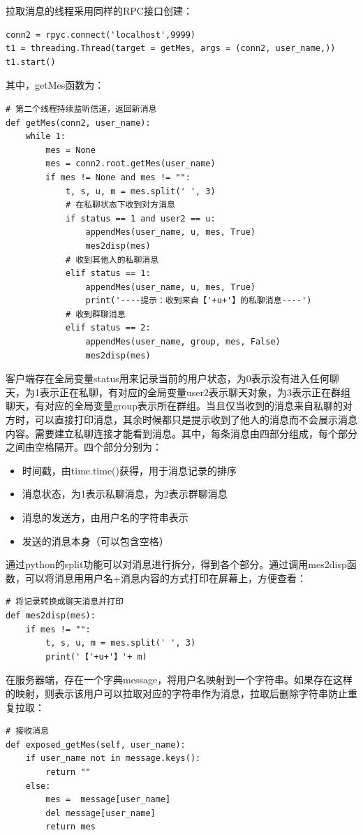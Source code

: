 \documentclass{report}
\begin{document}
拉取消息的线程采用同样的RPC接口创建：
\begin{lstlisting}
conn2 = rpyc.connect('localhost',9999)
t1 = threading.Thread(target = getMes, args = (conn2, user_name,))
t1.start()
\end{lstlisting}
其中，getMes函数为：
\begin{lstlisting}
# 第二个线程持续监听信道，返回新消息
def getMes(conn2, user_name):
    while 1:
        mes = None
        mes = conn2.root.getMes(user_name)
        if mes != None and mes != "":
            t, s, u, m = mes.split(' ', 3)
            # 在私聊状态下收到对方消息
            if status == 1 and user2 == u:
                appendMes(user_name, u, mes, True)
                mes2disp(mes)
            # 收到其他人的私聊消息
            elif status == 1:
                appendMes(user_name, u, mes, True)
                print('----提示：收到来自【'+u+'】的私聊消息----')
            # 收到群聊消息
            elif status == 2:
                appendMes(user_name, group, mes, False)
                mes2disp(mes)
\end{lstlisting}
客户端存在全局变量status用来记录当前的用户状态，为0表示没有进入任何聊天，为1表示正在私聊，有对应的全局变量user2表示聊天对象，为3表示正在群组聊天，有对应的全局变量group表示所在群组。当且仅当收到的消息来自私聊的对方时，可以直接打印消息，其余时候都只是提示收到了他人的消息而不会展示消息内容。需要建立私聊连接才能看到消息。其中，每条消息由四部分组成，每个部分之间由空格隔开。四个部分分别为：
\begin{itemize}
\item 时间戳，由time.time()获得，用于消息记录的排序
\item 消息状态，为1表示私聊消息，为2表示群聊消息
\item 消息的发送方，由用户名的字符串表示
\item 发送的消息本身（可以包含空格）
\end{itemize}
通过python的split功能可以对消息进行拆分，得到各个部分。通过调用mes2disp函数，可以将消息用用户名+消息内容的方式打印在屏幕上，方便查看：
\begin{lstlisting}
# 将记录转换成聊天消息并打印
def mes2disp(mes):
    if mes != "":
        t, s, u, m = mes.split(' ', 3)
        print('【'+u+'】'+ m)
\end{lstlisting}
在服务器端，存在一个字典message，将用户名映射到一个字符串。如果存在这样的映射，则表示该用户可以拉取对应的字符串作为消息，拉取后删除字符串防止重复拉取：
\begin{lstlisting}
# 接收消息
def exposed_getMes(self, user_name):
    if user_name not in message.keys():
        return ""
    else:
        mes =  message[user_name]
        del message[user_name]
        return mes
\end{lstlisting}
\end{document}
